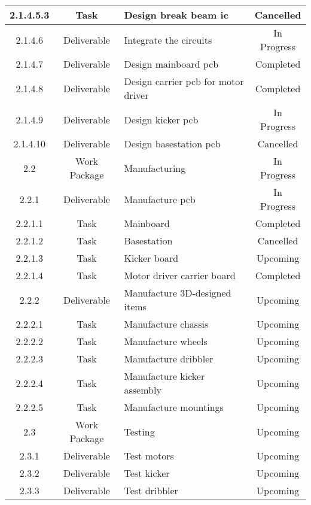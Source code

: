 \begin{longtable}{|c|c|m{}|c|}
    \rowcolor{c} 2.1.4.5.3 & Task & Design break beam \acs{ic} & Cancelled \\ \hline
    \rowcolor{p} 2.1.4.6 & Deliverable & Integrate the circuits & In Progress \\ \hline
    \rowcolor{d} 2.1.4.7 & Deliverable & Design mainboard \acs{pcb} & Completed \\ \hline
    \rowcolor{d} 2.1.4.8 & Deliverable & Design carrier \acs{pcb} for motor driver & Completed \\ \hline
    \rowcolor{p} 2.1.4.9 & Deliverable & Design kicker \acs{pcb} & In Progress \\ \hline
    \rowcolor{c} 2.1.4.10 & Deliverable & Design basestation \acs{pcb} & Cancelled \\ \hline
    \rowcolor{p} 2.2 & Work Package & Manufacturing & In Progress \\ \hline
    \rowcolor{p} 2.2.1 & Deliverable & Manufacture \acs{pcb} & In Progress \\ \hline
    \rowcolor{d} 2.2.1.1 & Task & Mainboard & Completed \\ \hline
    \rowcolor{c} 2.2.1.2 & Task & Basestation & Cancelled \\ \hline
    \rowcolor{u} 2.2.1.3 & Task & Kicker board & Upcoming\\ \hline
    \rowcolor{d} 2.2.1.4 & Task & Motor driver carrier board & Completed \\ \hline
    \rowcolor{u} 2.2.2 & Deliverable & Manufacture 3D-designed items & Upcoming \\ \hline
    \rowcolor{u} 2.2.2.1 & Task & Manufacture chassis & Upcoming \\ \hline
    \rowcolor{u} 2.2.2.2 & Task & Manufacture wheels & Upcoming \\ \hline
    \rowcolor{u} 2.2.2.3 & Task & Manufacture dribbler & Upcoming \\ \hline
    \rowcolor{u} 2.2.2.4 & Task & Manufacture kicker assembly & Upcoming \\ \hline
    \rowcolor{u} 2.2.2.5 & Task & Manufacture mountings & Upcoming \\ \hline
    \rowcolor{u} 2.3 & Work Package & Testing & Upcoming \\ \hline
    \rowcolor{u} 2.3.1 & Deliverable & Test motors & Upcoming \\ \hline
    \rowcolor{u} 2.3.2 & Deliverable & Test kicker & Upcoming \\ \hline
    \rowcolor{u} 2.3.3 & Deliverable & Test dribbler & Upcoming \\ \hline

\end{longtable}
